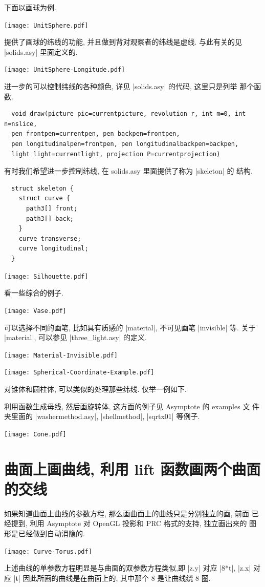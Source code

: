 \documentclass[nofonts,CJKnormalspaces]{ctexbook}[2009/05/20]
\begin{document}
下面以画球为例.
\begin{center}\texttt{[image: UnitSphere.pdf]}\end{center}%

提供了画球的纬线的功能, 并且做到背对观察者的纬线是虚线.
与此有关的见 |solids.asy| 里面定义的.
\begin{center}\texttt{[image: UnitSphere-Longitude.pdf]}\end{center}%

进一步的可以控制纬线的各种颜色, 详见 |solids.asy| 的代码, 这里只是列举
那个函数.
\begin{lstlisting}
  void draw(picture pic=currentpicture, revolution r, int m=0, int n=nslice,
  pen frontpen=currentpen, pen backpen=frontpen,
  pen longitudinalpen=frontpen, pen longitudinalbackpen=backpen,
  light light=currentlight, projection P=currentprojection)
\end{lstlisting}
有时我们希望进一步控制纬线, 在 solids.asy 里面提供了称为 |skeleton| 的
结构.
\begin{lstlisting}
  struct skeleton {
    struct curve {
      path3[] front;
      path3[] back;
    }
    curve transverse;
    curve longitudinal;
  }
\end{lstlisting}
\begin{center}\texttt{[image: Silhouette.pdf]}\end{center}%

看一些综合的例子.
\begin{center}\texttt{[image: Vase.pdf]}\end{center}%

可以选择不同的画笔, 比如具有质感的 |material|, 不可见画笔 |invisible|
等. 关于 |material|, 可以参见 |three_light.asy| 的定义.
\begin{center}\texttt{[image: Material-Invisible.pdf]}\end{center}%

\begin{center}\texttt{[image: Spherical-Coordinate-Example.pdf]}\end{center}%

对锥体和圆柱体, 可以类似的处理那些纬线. 仅举一例如下.

利用函数生成母线, 然后画旋转体, 这方面的例子见 Asymptote 的 examples 文
件夹里面的 |washermethod.asy|, |shellmethod|, |sqrtx01| 等例子.
\begin{center}\texttt{[image: Cone.pdf]}\end{center}%


\section{曲面上画曲线, 利用 lift 函数画两个曲面的交线}
如果知道曲面上曲线的参数方程, 那么画曲面上的曲线只是分别独立的画, 前面
已经提到, 利用 Asymptote 对 OpenGL 投影和 PRC 格式的支持, 独立画出来的
图形是已经做到自动消隐的.
\begin{center}\texttt{[image: Curve-Torus.pdf]}\end{center}%

上述曲线的单参数方程明显是与曲面的双参数方程类似,即 |z.y| 对应 |8*t|,
|z.x| 对应 |t| 因此所画的曲线是在曲面上的, 其中那个 8 是让曲线绕 8 圈.
\end{document}
